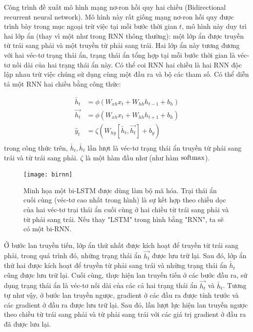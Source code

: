 Công trình \cite{schuster1997} đề xuất mô hình mạng nơ-ron hồi quy hai chiều (Bidirectional recurrent neural network). Mô hình này rất giống mạng nơ-ron hồi quy được trình bày trong mục \cite{rnnsection} ngoại trừ việc tại mỗi bước thời gian $t$, mô hình này duy trì hai lớp ẩn (thay vì một như trong RNN thông thường): một lớp ẩn được truyền từ trái sang phải và một truyền từ phải sang trái. Hai lớp ẩn này tương đương với hai véc-tơ trạng thái ẩn, trạng thái ẩn tổng hợp tại mỗi bước thời gian là véc-tơ nối dài của hai trạng thái ẩn này. Có thể coi RNN hai chiều là hai RNN độc lập nhau trừ việc chúng sử dụng cùng một đầu ra và bộ các tham số. Có thể diễn tả một RNN hai chiều bằng công thức:

\begin{align}
	\overleftarrow{h_t} &= \phi \left(W_{xh} x_{t} + W_{hh} h_{t-1} + b_h \right) \\ \label{birnn1} 
    \overrightarrow{h_t} &= \phi \left(W_{xh} x_{t} + W_{hh} h_{t+1} + b_h \right) \\ \label{birnn2}
    \hat{y}_t &= \zeta \left(W_{hy} \left[\overleftarrow{h_t}, \overrightarrow{h_t} \right] + b_y \right) \\ \label{birnn3}	 \nonumber
\end{align}
trong công thức trên, $\overleftarrow{h_t}, \overleftarrow{h_t}$ lần lượt là véc-tơ trạng thái ẩn truyền từ phải sang trái và từ trái sang phải. $\zeta$ là một hàm đầu như (như hàm $\mathrm{softmax}$).

\begin{figure}
	\centering
	\texttt{[image: birnn]}
	\caption[Minh họa một bi-LSTM được dùng làm bộ mã hóa]{Minh họa một bi-LSTM được dùng làm bộ mã hóa. Trại thái ẩn cuối cùng (véc-tơ cao nhất trong hình) là sự kết hợp theo chiều dọc của hai véc-tơ trại thái ẩn cuối cùng ở hai chiều từ trái sang phải và từ phải sang trái. Nếu thay "LSTM" trong hình bằng "RNN", ta sẽ có một bi-RNN.}
	\label{fig_birnn}
\end{figure}

Ở bước lan truyền tiến, lớp ẩn thứ nhất được kích hoạt để truyền từ trái sang phải, trong quá trình đó, những trạng thái ẩn $\overrightarrow{h_t}$ được lưu trữ lại. Sau đó, lớp ẩn thứ hai được kích hoạt để truyền từ phải sang trái và những trạng thái ẩn $\overleftarrow{h_t}$ cũng được lưu trữ lại. Cuối cùng, thực hiện lan truyền tiến ở các bước đầu ra, sử dụng trạng thái ẩn là véc-tơ nối dài của các cả hai trạng thái ẩn $\overrightarrow{h_t}$ và $\overleftarrow{h_t}$. Tương tự như vậy, ở bước lan truyền ngược, gradient ở các đầu ra được tính trước và các gradient ở đầu ra được lưu trữ lại. Sau đó, lần lượt lực hiện lan truyền ngược theo chiều từ trái sang phải và từ phải sang trái với các giá trị gradient ở đầu ra đã được lưu lại.

